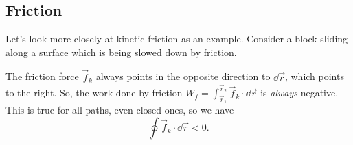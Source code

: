 \documentclass[../classical_mechanics.tex]{subfiles}
\begin{document}
        \subsection{Friction}\label{sec:non-conservative-forces:subsec:friction}
            Let's look more closely at kinetic friction as an example.
            Consider a block sliding along a surface which is being slowed down by friction.
            \begin{figure}[H]
                \centering
            \end{figure}
            The friction force $\vec{f}_k$ always points in the opposite direction to $\dd{\vec{r}}$, which points to the right.
            So, the work done by friction $W_f=\int_{\vec{r}_1}^{\vec{r}_2}\vec{f}_k\cdot\dd{\vec{r}}$ is \textit{always} negative.
            This is true for all paths, even closed ones, so we have
            \begin{equation}
                \oint\vec{f}_k\cdot\dd{\vec{r}}<0.
            \end{equation}
\end{document}
